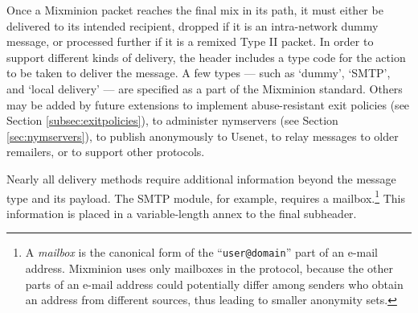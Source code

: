 \documentclass[11pt]{IEEEtran}
\begin{document}

Once a Mixminion packet reaches the final mix in its path, it must
either be delivered to its intended recipient, dropped if it is an
intra-network dummy message, or processed further if it is a remixed
Type II packet. In order to support different kinds of
delivery, the header includes a type code for the action to be taken
to deliver the message.  A few types --- such as `dummy', `SMTP', and
`local delivery' --- are specified as a part of the Mixminion
standard.  Others may be added by future extensions to
implement abuse-resistant exit policies (see Section
\ref{subsec:exitpolicies}), to administer nymservers (see Section
\ref{sec:nymservers}), to publish anonymously to Usenet, to relay
messages to older remailers, or to support other protocols.  

Nearly all delivery methods require additional information beyond the
message type and its payload.  The SMTP module, for example, requires
a mailbox.\footnote{A {\it mailbox} is the canonical form of the
``{\tt user@domain}'' part of an e-mail address. Mixminion uses only
mailboxes in the protocol, because the other parts
of an e-mail address could potentially differ among senders who
obtain an address from different sources, thus leading to smaller
anonymity sets.}
This information is placed
in a variable-length annex to the final subheader.

%
%
\end{document}
